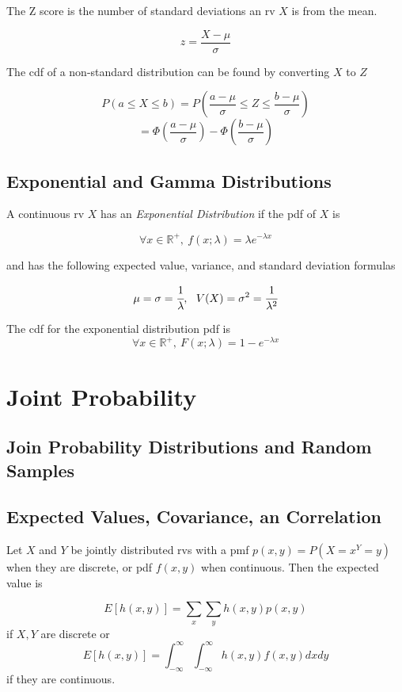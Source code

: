 \documentclass[10pt,twoside,a4paper]{article}
\begin{document}
\begin{multicols*}{2}
\begin{flushleft}
	The Z score is the number of standard deviations an rv $X$ is from the mean.

	$$ z = \frac{X - \mu}{\sigma} $$

	The cdf of a non-standard distribution can be found by converting $X$ to $Z$

	$$ P(a \leq X \leq b) = P(\frac{a - \mu}{\sigma} \leq Z \leq \frac{b - \mu}{\sigma})$$
	$$  = \Phi(\frac{a - \mu}{\sigma}) - \Phi(\frac{b - \mu}{\sigma}) $$

	\subsection{Exponential and Gamma Distributions}
	A continuous rv $X$ has an \textit{Exponential Distribution} if the pdf of $X$ is

	$$ \forall x \in \mathbb{R}^+,~f(x; \lambda) = \lambda e ^{-\lambda x}$$

	and has the following expected value, variance, and standard deviation formulas

	$$\mu = \sigma = \cfrac{1}{\lambda},~~V(X) = \sigma^2 = \cfrac{1}{\lambda^2}$$

	The cdf for the exponential distribution pdf is 
	$$ \forall x \in \mathbb{R}^+,~ F(x;\lambda) = 1 - e^{-\lambda x}$$


	\section{Joint Probability}
	\subsection{Join Probability Distributions and Random Samples}
	\subsection{Expected Values, Covariance, an Correlation}
	Let $X$ and $Y$ be jointly distributed rvs with a pmf $p(x, y) = P(X = x ^ Y = y)$ when they are 
	discrete, or pdf $f(x, y)$ when continuous. Then the expected value is

	$$ E[h(x,y)] = \sum_x\sum_y h(x, y)p(x, y)$$
	if $X, Y$ are discrete or 
	$$ E[h(x,y)] = \int_{-\infty}^{\infty}\int_{-\infty}^{\infty} h(x, y)f(x, y)dxdy$$
	if they are continuous.


\end{flushleft}
\end{multicols*}
\end{document}

